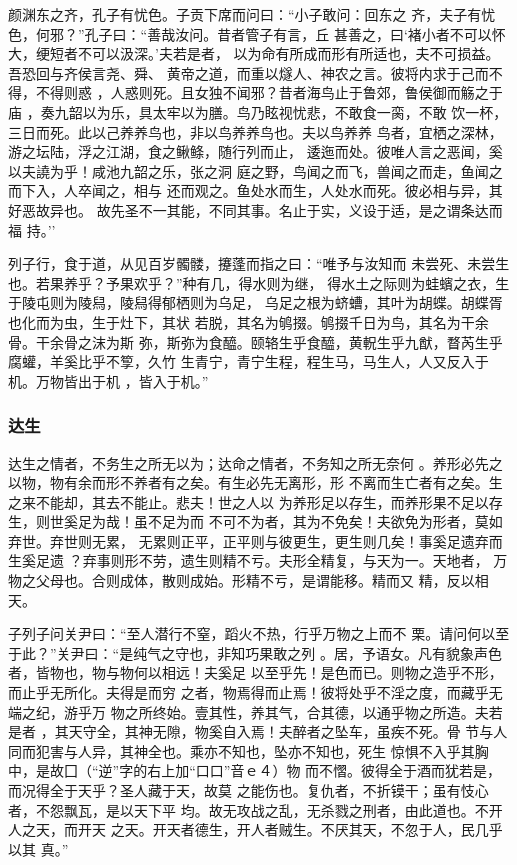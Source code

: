 \documentclass[]{article}
\begin{document}
颜渊东之齐，孔子有忧色。子贡下席而问曰：``小子敢问：回东之
齐，夫子有忧色，何邪？''孔子曰：``善哉汝问。昔者管子有言，丘
甚善之，曰`褚小者不可以怀大，绠短者不可以汲深。'夫若是者，
以为命有所成而形有所适也，夫不可损益。吾恐回与齐侯言尧、舜、
黄帝之道，而重以燧人、神农之言。彼将内求于己而不得，不得则惑
，人惑则死。且女独不闻邪？昔者海鸟止于鲁郊，鲁侯御而觞之于庙
，奏九韶以为乐，具太牢以为膳。鸟乃眩视忧悲，不敢食一脔，不敢
饮一杯，三日而死。此以己养养鸟也，非以鸟养养鸟也。夫以鸟养养
鸟者，宜栖之深林，游之坛陆，浮之江湖，食之鳅鲦，随行列而止，
逶迤而处。彼唯人言之恶闻，奚以夫譊为乎！咸池九韶之乐，张之洞
庭之野，鸟闻之而飞，兽闻之而走，鱼闻之而下入，人卒闻之，相与
还而观之。鱼处水而生，人处水而死。彼必相与异，其好恶故异也。
故先圣不一其能，不同其事。名止于实，义设于适，是之谓条达而福 持。''

列子行，食于道，从见百岁髑髅，攓蓬而指之曰：``唯予与汝知而
未尝死、未尝生也。若果养乎？予果欢乎？''种有几，得水则为继，
得水土之际则为蛙蠙之衣，生于陵屯则为陵舄，陵舄得郁栖则为乌足，
乌足之根为蛴螬，其叶为胡蝶。胡蝶胥也化而为虫，生于灶下，其状
若脱，其名为鸲掇。鸲掇千日为鸟，其名为干余骨。干余骨之沫为斯
弥，斯弥为食醯。颐辂生乎食醯，黄軦生乎九猷，瞀芮生乎腐蠸，羊奚比乎不箰，久竹
生青宁，青宁生程，程生马，马生人，人又反入于机。万物皆出于机
，皆入于机。''

\hypertarget{header-n815}{%
\subsubsection{达生}\label{header-n815}}

达生之情者，不务生之所无以为；达命之情者，不务知之所无奈何
。养形必先之以物，物有余而形不养者有之矣。有生必先无离形，形
不离而生亡者有之矣。生之来不能却，其去不能止。悲夫！世之人以
为养形足以存生，而养形果不足以存生，则世奚足为哉！虽不足为而
不可不为者，其为不免矣！夫欲免为形者，莫如弃世。弃世则无累，
无累则正平，正平则与彼更生，更生则几矣！事奚足遗弃而生奚足遗
？弃事则形不劳，遗生则精不亏。夫形全精复，与天为一。天地者，
万物之父母也。合则成体，散则成始。形精不亏，是谓能移。精而又
精，反以相天。

子列子问关尹曰：``至人潜行不窒，蹈火不热，行乎万物之上而不
栗。请问何以至于此？''关尹曰：``是纯气之守也，非知巧果敢之列
。居，予语女。凡有貌象声色者，皆物也，物与物何以相远！夫奚足
以至乎先！是色而已。则物之造乎不形，而止乎无所化。夫得是而穷
之者，物焉得而止焉！彼将处乎不淫之度，而藏乎无端之纪，游乎万
物之所终始。壹其性，养其气，合其德，以通乎物之所造。夫若是者
，其天守全，其神无隙，物奚自入焉！夫醉者之坠车，虽疾不死。骨
节与人同而犯害与人异，其神全也。乘亦不知也，坠亦不知也，死生
惊惧不入乎其胸中，是故囗（``逆''字的右上加``口口''音ｅ４）物
而不慴。彼得全于酒而犹若是，而况得全于天乎？圣人藏于天，故莫
之能伤也。复仇者，不折镆干；虽有忮心者，不怨飘瓦，是以天下平
均。故无攻战之乱，无杀戮之刑者，由此道也。不开人之天，而开天
之天。开天者德生，开人者贼生。不厌其天，不忽于人，民几乎以其 真。''
\end{document}
